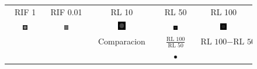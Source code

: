 \documentclass{./packages/optica-article}
\begin{document}
\begin{figure}[hbp]
	\begin{center}
		\begin{tabular}{c c | c c c}
			RIF 1                                                                                         &
			RIF 0.01                                                                                      &
			RL 10                                                                                         &
			RL 50                                                                                         &
			RL 100
			\\
			\includegraphics[width=0.13\textwidth]{Simulation deconvolution/ref_np_0.01/RIF_1}            &
			\includegraphics[width=0.13\textwidth]{Simulation deconvolution/ref_np_0.01/RIF_0.01}         &
			\includegraphics[width=0.13\textwidth]{Simulation deconvolution/ref_np_0.01/RL_10}            &
			\includegraphics[width=0.13\textwidth]{Simulation deconvolution/ref_np_0.01/RL_50}            &
			\includegraphics[width=0.13\textwidth]{Simulation deconvolution/ref_np_0.01/RL_100}
			\\    \hline
			                                                                                              &   & Comparacion &
			$\frac{\textrm{RL 100}}{\textrm{RL 50}}$                                                      &

			$\textrm{RL 100} - \textrm{RL 50}$
			\\	                                                                                     & & &
			\includegraphics[width=0.13\textwidth]{Simulation deconvolution/ref_np_0.01/RL_100_div_RL_50} &


\end{tabular}
\end{center}
\end{figure}
\end{document}
